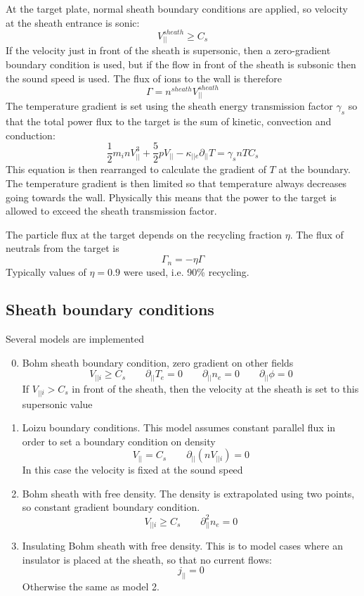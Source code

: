 \documentclass[12pt,a4paper]{article}
\begin{document}
At the target plate, normal sheath boundary conditions are applied, so velocity at the sheath entrance
is sonic:
\begin{equation}
V_{||}^{sheath} \ge C_s
\end{equation}
If the velocity just in front of the sheath is supersonic, then a zero-gradient boundary condition is used, but if
the flow in front of the sheath is subsonic then the sound speed is used. The flux of ions to the wall is therefore 
\begin{equation}
\Gamma = n^{sheath}V_{||}^{sheath}
\end{equation}
The temperature gradient is set using the sheath energy transmission factor $\gamma_s$ so 
that the total power flux to the target is the sum of kinetic, convection and conduction:
\begin{equation}
\frac{1}{2}m_inV_{||}^3  + \frac{5}{2}pV_{||} - \kappa_{||e}\partial_{||}T = \gamma_s nTC_s
\end{equation}
This equation is then rearranged to calculate the gradient of $T$ at the boundary. 
The temperature gradient is then limited so that temperature always decreases going
towards the wall. Physically this means that the power to the target is allowed to exceed the sheath
transmission factor.

The particle flux at the target depends on the recycling fraction $\eta$. The flux of neutrals from
the target is 
\[
\Gamma_n = -\eta \Gamma
\]
Typically values of $\eta = 0.9$ were used, i.e. 90\% recycling. 


\subsection{Sheath boundary conditions}

Several models are implemented
\begin{enumerate}
  \setcounter{enumi}{-1}  %
\item Bohm sheath boundary condition, zero gradient on other fields
  \[
  V_{||i} \ge C_s \qquad \partial_{||}T_e = 0 \qquad \partial_{||}n_e = 0 \qquad \partial_{||}\phi = 0
  \]
  If $V_{||i} > C_s$ in front of the sheath, then the velocity at the sheath is set to this supersonic value
\item Loizu boundary conditions. This model assumes constant parallel flux in order to set a boundary condition on density
  \[
  V_{||} = C_s \qquad \partial_{||}\left(nV_{||i}\right) = 0
  \]
  In this case the velocity is fixed at the sound speed
\item Bohm sheath with free density. The density is extrapolated using two points, so constant gradient boundary condition.
  \[
  V_{||i} \ge C_s \qquad \partial_{||}^2n_e = 0
  \]
\item Insulating Bohm sheath with free density. This is to model cases where an insulator is placed at the sheath, so
  that no current flows:
  \[
  j_{||} = 0
  \]
  Otherwise the same as model 2.
\end{enumerate}
\end{document}
